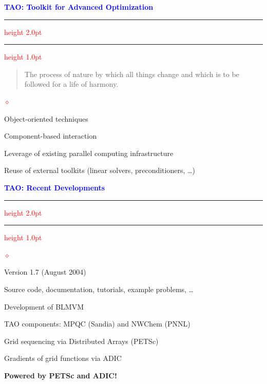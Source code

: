 \documentclass{seminar}
\newcommand{\reddiamond}{\textcolor{red}{$\diamond$}}
\newcommand{\redstripe}{\textcolor{red}{\hrule height 2.0pt\hfil}
             \vspace{-1.8pt}
             \textcolor{red}{\hrule height 1.0pt\hfil}
}
\newcommand{\heading}[1]{%
   \centerline{\textcolor{blue}{\textbf{#1}}}%
    \redstripe%
    \bigskip
}
\begin{document}
\begin{slide}

\heading{TAO: Toolkit for Advanced Optimization}

\begin{quote}
The process of nature by which all things change
and which is to be followed for a life of harmony.  
\end{quote}


\bigskip

\begin{list}{\reddiamond}{}
\item
Object-oriented techniques
\item
Component-based interaction
\item
Leverage of existing parallel computing infrastructure
\item
Reuse of external toolkits (linear solvers, preconditioners, \ldots)
\end{list}

\vfill

\end{slide}

\begin{slide}

\heading{TAO: Recent Developments}

\begin{list}{\reddiamond}{}
\item
Version 1.7 (August 2004)
\item
Source code, documentation, tutorials, 
example problems, \ldots
\item
Development of BLMVM
\item
TAO components: MPQC (Sandia) and NWChem (PNNL)
\item
Grid sequencing via Distributed Arrays (PETSc)
\item
Gradients of grid functions via ADIC
\end{list}

\bigskip

\textbf{Powered by PETSc and ADIC!}

\vfill

\end{slide}
\end{document}

